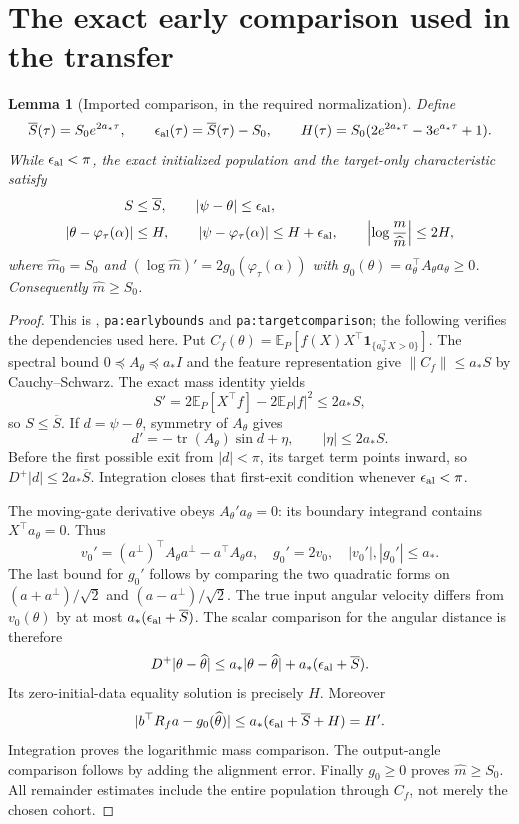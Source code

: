 \documentclass[11pt]{article}
\numberwithin{equation}{section}
\newtheorem{lemma}[theorem]{Lemma}
\theoremstyle{remark}
\newcommand{\E}{\mathbb E}
\newcommand{\ind}{\mathbf1}
\newcommand{\norm}[1]{\left\lVert#1\right\rVert}
\DeclareMathOperator{\tr}{tr}
\begin{document}
\section{The exact early comparison used in the transfer}
\label{inc:AN02:arrival:v1:early}

\begin{lemma}[Imported comparison, in the required normalization]
\label{inc:AN02:arrival:v1:comparison}
Define
\[
 \overline S(\tau)=S_0e^{2a_*\tau},\qquad
 \epsilon_{\rm al}(\tau)=\overline S(\tau)-S_0,
 \qquad
 H(\tau)=S_0(2e^{2a_*\tau}-3e^{a_*\tau}+1).
\]
While $\epsilon_{\rm al}<\pi$, the exact initialized population and the
target-only characteristic satisfy
\begin{align}
 S&\le\overline S,\qquad |\psi-\theta|\le\epsilon_{\rm al},
 \label{inc:AN02:arrival:v1:comparison1}\\
 |\theta-\varphi_\tau(\alpha)|&\le H,\qquad
 |\psi-\varphi_\tau(\alpha)|\le H+\epsilon_{\rm al},\qquad
 \left|\log\frac{m}{\widehat m}\right|\le2H,
 \label{inc:AN02:arrival:v1:comparison2}
\end{align}
where $\widehat m_0=S_0$ and
$(\log\widehat m)'=2g_0(\varphi_\tau(\alpha))$ with
$g_0(\theta)=a_\theta^\top A_\theta a_\theta\ge0$.
Consequently $\widehat m\ge S_0$.
\end{lemma}
\begin{proof}
This is \cite{P}, \texttt{pa:earlybounds} and
\texttt{pa:targetcomparison}; the following verifies the dependencies used
here. Put
$C_f(\theta)=\E_P[f(X)X^\top\ind_{\{a_\theta^\top X>0\}}]$.
The spectral bound $0\preceq A_\theta\preceq a_*I$ and the feature
representation give $\norm{C_f}\le a_*S$ by Cauchy--Schwarz.
The exact mass identity yields
\[
 S'=2\E_P[X^\top f]-2\E_P|f|^2\le2a_*S,
\]
so $S\le\overline S$. If $d=\psi-\theta$, symmetry of $A_\theta$ gives
\[
 d'=-\tr(A_\theta)\sin d+\eta,\qquad |\eta|\le2a_*S.
\]
Before the first possible exit from $|d|<\pi$, its target term points
inward, so $D^+|d|\le2a_*\overline S$. Integration closes that first-exit
condition whenever $\epsilon_{\rm al}<\pi$.

The moving-gate derivative obeys $A_\theta'a_\theta=0$: its boundary
integrand contains $X^\top a_\theta=0$. Thus
\[
 v_0'=(a^\perp)^\top A_\theta a^\perp-a^\top A_\theta a,
 \quad g_0'=2v_0,\quad |v_0'|,|g_0'|\le a_*.
\]
The last bound for $g_0'$ follows by comparing the two quadratic forms
on $(a+a^\perp)/\sqrt2$ and $(a-a^\perp)/\sqrt2$.
The true input angular velocity differs from $v_0(\theta)$ by at most
$a_*(\epsilon_{\rm al}+\overline S)$. The scalar comparison for the
angular distance is therefore
\[
 D^+|\theta-\widehat\theta|
 \le a_*|\theta-\widehat\theta|
       +a_*(\epsilon_{\rm al}+\overline S).
\]
Its zero-initial-data equality solution is precisely $H$. Moreover
\[
 |b^\top R_fa-g_0(\widehat\theta)|
 \le a_*(\epsilon_{\rm al}+\overline S+H)=H'.
\]
Integration proves the logarithmic mass comparison. The output-angle
comparison follows by adding the alignment error. Finally $g_0\ge0$
proves $\widehat m\ge S_0$. All remainder estimates include the entire
population through $C_f$, not merely the chosen cohort.
\end{proof}
\end{document}
